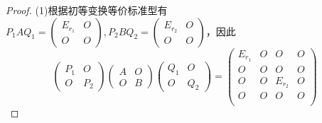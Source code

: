 \begin{proof}
  (1)根据初等变换等价标准型有$P_1AQ_1 = \left(
    \begin{array}{cc}
      E_{r_1}&O\\
      O&O
    \end{array}
  \right), P_2BQ_2 = \left(
    \begin{array}{cc}
      E_{r_2}&O\\
      O&O
    \end{array}
  \right)$，因此
  \begin{equation*}
    \left(
      \begin{array}{cc}
        P_1&O\\
        O&P_2
      \end{array}
    \right) \left(
      \begin{array}{cc}
        A&O\\
        O&B
      \end{array}
    \right)\left(
      \begin{array}{cc}
        Q_1&O\\
        O&Q_2
      \end{array}
    \right) = \left(
      \begin{array}{cccc}
        E_{r_1}&O&O&O\\
        O&O&O&O\\
        O&O&E_{r_2}&O\\
        O&O&O&O\\
      \end{array}
    \right)
  \end{equation*}
  

\end{proof}
